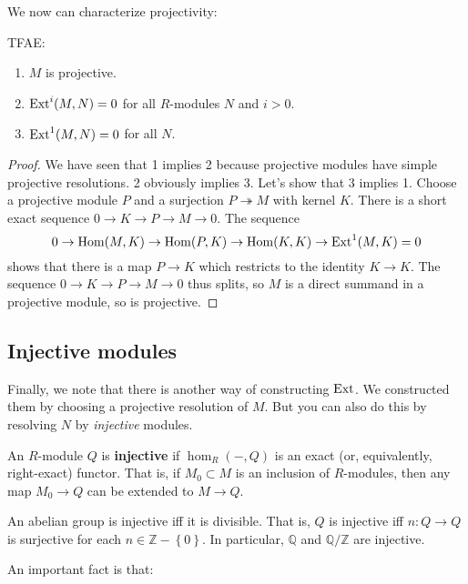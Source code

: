 We now can characterize projectivity:
\begin{corollary} 
TFAE:
\begin{enumerate}
\item $M$ is projective. 
\item $\mathrm{Ext}^i(M,N) = 0$ for all $R$-modules $N$ and $i>0$.
\item  $\mathrm{Ext}^1(M,N)=0$ for all $N$.
\end{enumerate}
\end{corollary} 
\begin{proof} 
We have seen that 1 implies 2 because projective modules have simple projective
resolutions. 2 obviously implies 3. Let's show that 3 implies 1. Choose a
projective module $P$ and a surjection $P \twoheadrightarrow M$ with kernel
$K$. There is a short exact sequence $0 \to K \to P \to M \to 0$. The sequence
\[ 0 \to \operatorname{Hom}(M,K) \to \operatorname{Hom}(P,K) \to \operatorname{Hom}(K,K) \to \mathrm{Ext}^1(M,K)=0  \]
shows that there is a map $P \to K$ which restricts to the identity $K \to K$.
The sequence $0 \to K \to P \to M \to 0$ thus splits, so $M$ is a direct
summand in a projective module, so is projective.
\end{proof} 

\subsection{Injective modules}

Finally, we note that there is another way of constructing $\mathrm{Ext}$. We
constructed them by choosing a projective resolution of $M$. But you can also
do this by resolving $N$ by \emph{injective} modules. 
\begin{definition} 
An $R$-module $Q$ is \textbf{injective} if $\hom_R(-,Q)$ is an exact (or,
equivalently, right-exact) functor. That is, if $M_0 \subset M$ is an inclusion
of $R$-modules, then any map $M_0 \to Q$ can be extended to $M \to Q$.
\end{definition} 


\begin{example} 
An abelian group is injective iff it is divisible. That is, $Q$ is injective
iff $n: Q \to Q$ is surjective for each $n \in \mathbb{Z} - \left\{0\right\}$.
In particular, $\mathbb{Q}$ and $\mathbb{Q}/\mathbb{Z}$ are injective.
\end{example} 

An important fact is that:


